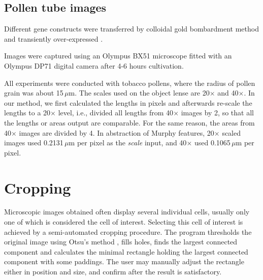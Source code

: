 \subsection{Pollen tube images}

Different gene constructs were transferred by colloidal gold bombardment method and transiently over-expressed \parencite{Twell1989transient}.



Images were captured using an Olympus BX51 microscope fitted with an Olympus DP71 digital camera after 4-6 hours cultivation.

All experiments were conducted with tobacco pollens, where the radius of pollen grain was about 15\,$\mu$m. The scales used on the object lense are 20$\times$ and 40$\times$. In our method, we first calculated the lengths in pixels and afterwards re-scale the lengths to a 20$\times$ level, i.e., divided all lengths from 40$\times$ images by 2, so that all the lengths or areas output are comparable. For the same reason, the areas from 40$\times$ images are divided by 4. In abstraction of Murphy features, 20$\times$ scaled images used 0.2131\,$\mu$m per pixel as the \emph{scale} input, and 40$\times$ used 0.1065\,$\mu$m per pixel.

\section{Cropping}

Microscopic images obtained often display several individual cells, usually only one of which is considered the cell of interest. Selecting this cell of interest is achieved by a semi-automated cropping procedure. The program thresholds the original image using Otsu's method \cite{Otsu:1975}, fills holes, finds the largest connected component and calculates the minimal rectangle holding the largest connected component with some paddings. The user may manually adjust the rectangle either in position and size, and confirm after the result is satisfactory.

